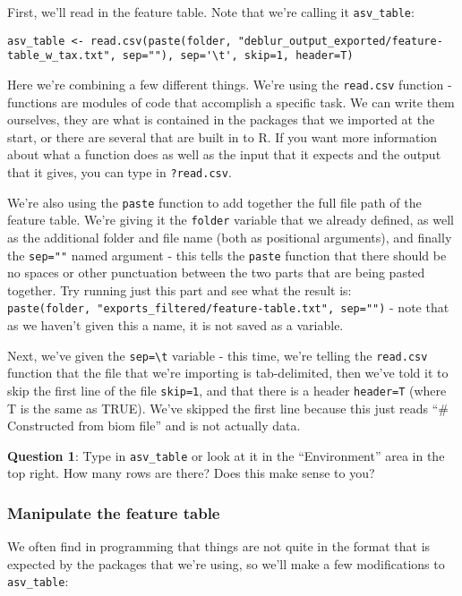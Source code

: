 \documentclass[
]{book}
\begin{document}
First, we'll read in the feature table. Note that we're calling it \texttt{asv\_table}:

\begin{verbatim}
asv_table <- read.csv(paste(folder, "deblur_output_exported/feature-table_w_tax.txt", sep=""), sep='\t', skip=1, header=T)
\end{verbatim}

Here we're combining a few different things. We're using the \texttt{read.csv} function - functions are modules of code that accomplish a specific task. We can write them ourselves, they are what is contained in the packages that we imported at the start, or there are several that are built in to R. If you want more information about what a function does as well as the input that it expects and the output that it gives, you can type in \texttt{?read.csv}.

We're also using the \texttt{paste} function to add together the full file path of the feature table. We're giving it the \texttt{folder} variable that we already defined, as well as the additional folder and file name (both as positional arguments), and finally the \texttt{sep=""} named argument - this tells the \texttt{paste} function that there should be no spaces or other punctuation between the two parts that are being pasted together. Try running just this part and see what the result is: \texttt{paste(folder,\ "exports\_filtered/feature-table.txt",\ sep="")} - note that as we haven't given this a name, it is not saved as a variable.

Next, we've given the \texttt{sep=\textquotesingle{}\textbackslash{}t\textquotesingle{}} variable - this time, we're telling the \texttt{read.csv} function that the file that we're importing is tab-delimited, then we've told it to skip the first line of the file \texttt{skip=1}, and that there is a header \texttt{header=T} (where T is the same as TRUE). We've skipped the first line because this just reads ``\# Constructed from biom file'' and is not actually data.

\textbf{Question 1}: Type in \texttt{asv\_table} or look at it in the ``Environment'' area in the top right. How many rows are there? Does this make sense to you?

\subsubsection{Manipulate the feature table}\label{manipulate-the-feature-table}

We often find in programming that things are not quite in the format that is expected by the packages that we're using, so we'll make a few modifications to \texttt{asv\_table}:
\end{document}
